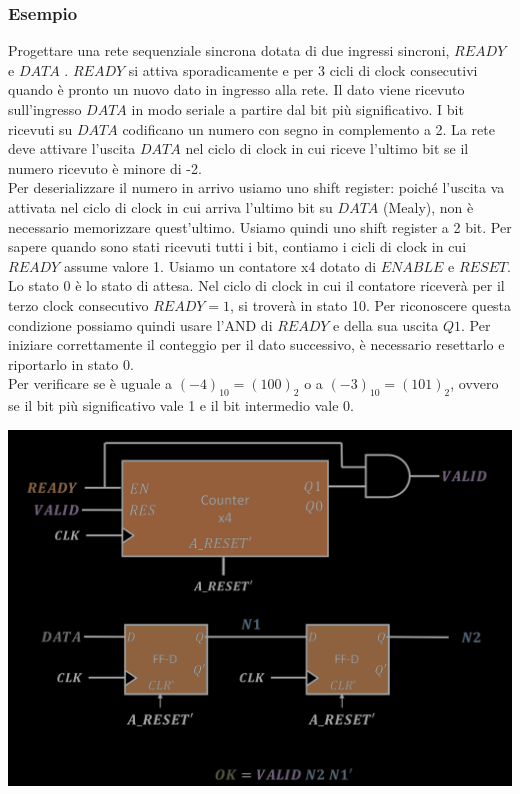 \documentclass{article}
\begin{document}
\subsubsection*{Esempio}
Progettare una rete sequenziale sincrona dotata di due ingressi sincroni, $READY$ e $DATA$ . $READY$ si attiva sporadicamente e per 3 cicli di clock consecutivi quando è pronto un nuovo dato in ingresso alla rete. Il dato viene ricevuto sull’ingresso $DATA$ in modo seriale a partire dal bit più significativo. I bit ricevuti su $DATA$ codificano un numero con segno in complemento a 2. La rete deve attivare l’uscita $DATA$ nel ciclo di clock in cui riceve l’ultimo bit se il numero ricevuto è minore di -2.
\vspace{0.2cm}\\
Per deserializzare il numero in arrivo usiamo uno shift register: poiché l’uscita va attivata nel ciclo di clock in cui arriva l’ultimo bit su $DATA$ (Mealy), non è necessario memorizzare quest’ultimo. Usiamo quindi uno shift register a 2 bit. Per sapere quando sono stati ricevuti tutti i bit, contiamo i cicli di clock in cui $READY$ assume valore 1. Usiamo un contatore x4 dotato di $ENABLE$ e $RESET$. Lo stato 0 è lo stato di attesa. Nel ciclo di clock in cui il contatore riceverà per il terzo clock consecutivo $READY=1$, si troverà in stato 10. Per riconoscere questa condizione possiamo quindi usare l’AND di $READY$ e della sua uscita $Q1$. Per iniziare correttamente il conteggio per il dato successivo, è necessario resettarlo e riportarlo in stato 0.\\
Per verificare se è uguale a $(-4)_{10} = (100)_2$ o a $(-3)_{10} = (101)_{2}$, ovvero se il bit più significativo vale 1 e il bit intermedio vale 0.
\begin{center}
    \includegraphics[scale=0.35]{sol ready data.png}
\end{center}
\end{document}
